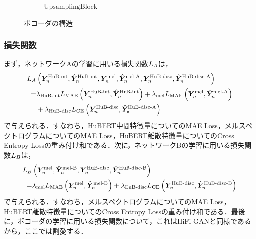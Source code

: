 \begin{figure}[tb]
\begin{subfigure}[b]{0.32\textwidth}
        \caption{$\text{UpsamplingBlock}$}
        \label{sec4:fig:vocoder_main_block}
    \end{subfigure}
    \caption{ボコーダの構造}
    \label{sec4:fig:vocoder}
\end{figure}

\subsubsection{損失関数}
まず，ネットワークAの学習に用いる損失関数$L_{A}$は，
\begin{equation}
    \begin{aligned}
        L_{A} & \left(\bm{Y}^{\text{HuB-int}}_{n}, \hat{\bm{Y}}^{\text{HuB-int}}_{n}, \bm{Y}^{\text{mel}}_{n}, \hat{\bm{Y}}^{\text{mel-A}}_{n}, \bm{Y}^{\text{HuB-disc}}_{n}, \hat{\bm{Y}}^{\text{HuB-disc-A}}_{n}\right)                 \\
        =      & \lambda_{\text{HuB-int}} L_{\text{MAE}}\left(\bm{Y}^{\text{HuB-int}}_{n}, \hat{\bm{Y}}^{\text{HuB-int}}_{n}\right) + \lambda_{\text{mel}} L_{\text{MAE}}\left(\bm{Y}^{\text{mel}}_{n}, \hat{\bm{Y}}^{\text{mel-A}}_{n}\right) \\
               & + \lambda_{\text{HuB-disc}} L_{\text{CE}}\left(\bm{Y}^{\text{HuB-disc}}_{n}, \hat{\bm{Y}}^{\text{HuB-disc-A}}_{n}\right)
    \end{aligned}
\end{equation}
で与えられる．すなわち，HuBERT中間特徴量についてのMAE Loss，メルスペクトログラムについてのMAE Loss，HuBERT離散特徴量についてのCross Entropy Lossの重み付け和である．次に，ネットワークBの学習に用いる損失関数$L_{B}$は，
\begin{equation}
    \begin{aligned}
        L_{B} & \left(\bm{Y}^{\text{mel}}_{n}, \hat{\bm{Y}}^{\text{mel-B}}_{n}, \bm{Y}^{\text{HuB-disc}}_{n}, \hat{\bm{Y}}^{\text{HuB-disc-B}}_{n}\right)                                                  \\
        =      & \lambda_{\text{mel}} L_{\text{MAE}}\left(\bm{Y}^{\text{mel}}_{n}, \hat{\bm{Y}}^{\text{mel-B}}_{n}\right) + \lambda_{\text{HuB-disc}} L_{\text{CE}}\left(\bm{Y}^{\text{HuB-disc}}_{n}, \hat{\bm{Y}}^{\text{HuB-disc-B}}_{n}\right)
    \end{aligned}
\end{equation}
で与えられる．すなわち，メルスペクトログラムについてのMAE Loss，HuBERT離散特徴量についてのCross Entropy Lossの重み付け和である．最後に，ボコーダの学習に用いる損失関数について，これはHiFi-GANと同様であるから，ここでは割愛する．
